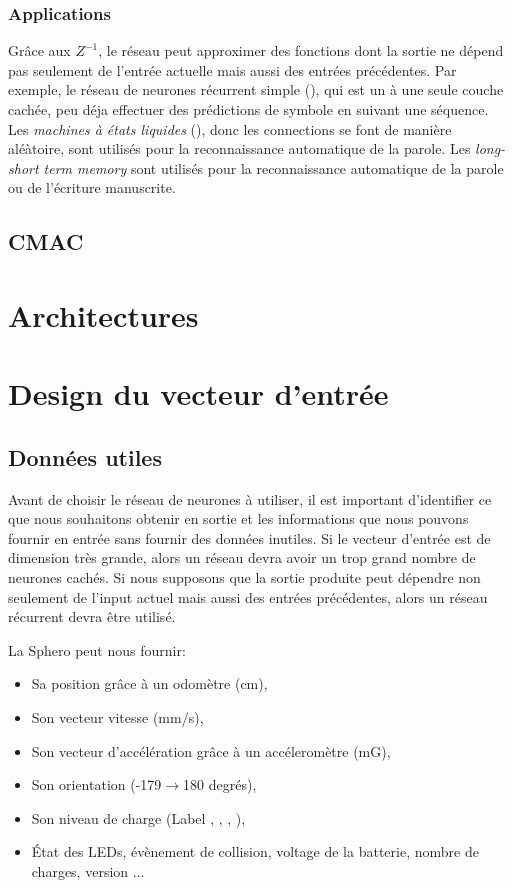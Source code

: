\documentclass[12pt,a4paper,oneside, titlepage]{article}
\begin{document}
\subsubsection*{Applications}
Grâce aux  $Z^{-1}$, le réseau peut approximer des fonctions dont la sortie ne dépend pas seulement de l'entrée actuelle mais aussi des entrées précédentes.
Par exemple, le réseau de neurones récurrent simple (\srn), qui est un \rmlp à une seule couche cachée, peu déja effectuer des prédictions de symbole en suivant une séquence.
Les \emph{machines à états liquides} (\lsm), donc les connections se font de manière aléàtoire, sont utilisés pour la reconnaissance automatique de la parole. %
Les \emph{long-short term memory} sont utilisés pour la reconnaissance automatique de la parole ou de l'écriture manuscrite. %

\subsection{CMAC}
\section{Architectures}
\section{Design du vecteur d'entrée}
\subsection{Données utiles}
Avant de choisir le réseau de neurones à utiliser, il est important d'identifier ce que nous souhaitons obtenir en sortie et les informations que nous pouvons fournir en entrée sans fournir des données inutiles.
Si le vecteur d'entrée est de dimension très grande, alors un réseau \rbf devra avoir un trop grand nombre de neurones cachés\cite{Gauthier}.
Si nous supposons que la sortie produite peut dépendre non seulement de l'input actuel mais aussi des entrées précédentes, alors un réseau récurrent devra être utilisé.

La Sphero peut nous fournir:\cite{SDKofficiels}
\begin{itemize}%
 \item Sa position grâce à un odomètre (cm),
 \item Son vecteur vitesse (mm/s),
 \item Son vecteur d'accélération grâce à un accéleromètre (mG),
 \item Son orientation (-179$\rightarrow$180 degrés),
 \item Son niveau de charge (Label , , , ),
 \item État des LEDs, évènement de collision, voltage de la batterie, nombre de charges, version ...
\end{itemize}
\end{document}
